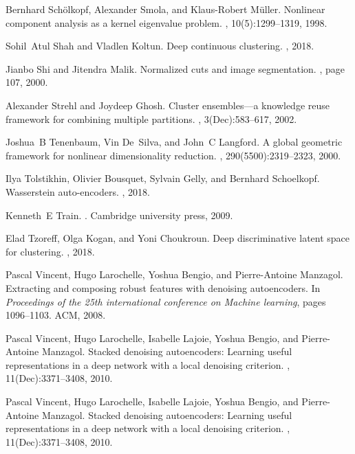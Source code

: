 \documentclass{article}
\begin{document}
\begin{thebibliography}{10}
Bernhard Sch{\"o}lkopf, Alexander Smola, and Klaus-Robert M{\"u}ller.
\newblock Nonlinear component analysis as a kernel eigenvalue problem.
, 10(5):1299--1319, 1998.

Sohil~Atul Shah and Vladlen Koltun.
\newblock Deep continuous clustering.
, 2018.

Jianbo Shi and Jitendra Malik.
\newblock Normalized cuts and image segmentation.
, page 107, 2000.

Alexander Strehl and Joydeep Ghosh.
\newblock Cluster ensembles---a knowledge reuse framework for combining
  multiple partitions.
, 3(Dec):583--617, 2002.

Joshua~B Tenenbaum, Vin De~Silva, and John~C Langford.
\newblock A global geometric framework for nonlinear dimensionality reduction.
, 290(5500):2319--2323, 2000.

Ilya Tolstikhin, Olivier Bousquet, Sylvain Gelly, and Bernhard Schoelkopf.
\newblock Wasserstein auto-encoders.
,
  2018.

Kenneth~E Train.
.
\newblock Cambridge university press, 2009.

Elad Tzoreff, Olga Kogan, and Yoni Choukroun.
\newblock Deep discriminative latent space for clustering.
, 2018.

Pascal Vincent, Hugo Larochelle, Yoshua Bengio, and Pierre-Antoine Manzagol.
\newblock Extracting and composing robust features with denoising autoencoders.
\newblock In {\em Proceedings of the 25th international conference on Machine
  learning}, pages 1096--1103. ACM, 2008.

Pascal Vincent, Hugo Larochelle, Isabelle Lajoie, Yoshua Bengio, and
  Pierre-Antoine Manzagol.
\newblock Stacked denoising autoencoders: Learning useful representations in a
  deep network with a local denoising criterion.
, 11(Dec):3371--3408, 2010.

Pascal Vincent, Hugo Larochelle, Isabelle Lajoie, Yoshua Bengio, and
  Pierre-Antoine Manzagol.
\newblock Stacked denoising autoencoders: Learning useful representations in a
  deep network with a local denoising criterion.
, 11(Dec):3371--3408, 2010.


\end{thebibliography}
\end{document}
